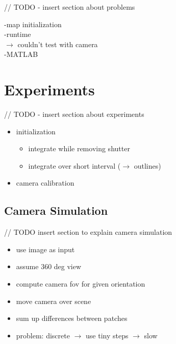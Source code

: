 \documentclass[10pt,twocolumn,letterpaper]{article}
\begin{document}
// TODO - insert section about problems

-map initialization\\
-runtime\\
$\rightarrow$ couldn't test with camera\\
-MATLAB\\


\section{Experiments}

// TODO - insert section about experiments

\begin{itemize}
\item initialization
\begin{itemize}
\item integrate while removing shutter
\item integrate over short interval ($\rightarrow$ outlines)
\end{itemize}
\item camera calibration
\end{itemize}



\subsection{Camera Simulation}

// TODO insert section to explain camera simulation

\begin{itemize}
\item use image as input
\item assume 360 deg view
\item compute camera fov for given orientation
\item move camera over scene
\item sum up differences between patches
\item problem: discrete
	$\rightarrow$ use tiny steps
		$\rightarrow$ slow
\end{itemize}
\end{document}
